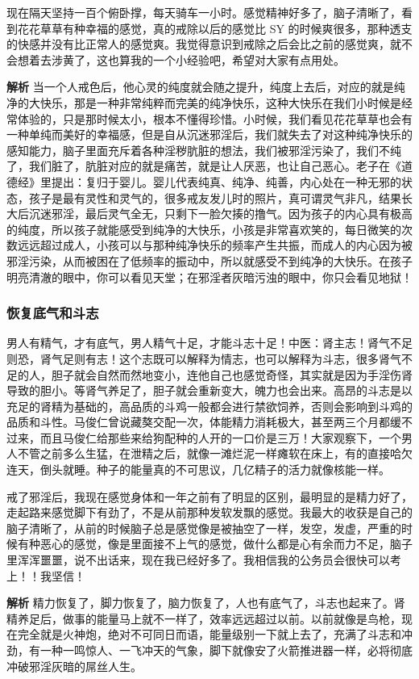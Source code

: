 \begin{case}
    现在隔天坚持一百个俯卧撑，每天骑车一小时。感觉精神好多了，脑子清晰了，看到花花草草有种幸福的感觉，真的戒除以后的感觉比 SY 的时候爽很多，那种透支的快感并没有比正常人的感觉爽。我觉得意识到戒除之后会比之前的感觉爽，就不会想着去涉黄了，这也算我的一个小经验吧，希望对大家有点用处。

    \textbf{解析} 当一个人戒色后，他心灵的纯度就会随之提升，纯度上去后，对应的就是纯净的大快乐，那是一种非常纯粹而完美的纯净快乐，这种大快乐在我们小时候是经常体验的，只是那时候太小，根本不懂得珍惜。小时候，我们看见花花草草也会有一种单纯而美好的幸福感，但是自从沉迷邪淫后，我们就失去了对这种纯净快乐的感知能力，脑子里面充斥着各种淫秽肮脏的想法，我们被邪淫污染了，我们不纯了，我们脏了，肮脏对应的就是痛苦，就是让人厌恶，也让自己恶心。老子在《道德经》里提出：复归于婴儿。婴儿代表纯真、纯净、纯善，内心处在一种无邪的状态，孩子是最有灵性和灵气的，很多戒友发儿时的照片，真可谓灵气非凡，结果长大后沉迷邪淫，最后灵气全无，只剩下一脸欠揍的撸气。因为孩子的内心具有极高的纯度，所以孩子就能感受到纯净的大快乐，小孩是非常喜欢笑的，每日微笑的次数远远超过成人，小孩可以与那种纯净快乐的频率产生共振，而成人的内心因为被邪淫污染，从而被困在了低频率的振动中，所以就感受不到纯净的大快乐。在孩子明亮清澈的眼中，你可以看见天堂；在邪淫者灰暗污浊的眼中，你只会看见地狱！
\end{case}

\subsubsection{恢复底气和斗志}

男人有精气，才有底气，男人精气十足，才能斗志十足！中医：肾主志！肾气不足则恐，肾气足则有志！这个志既可以解释为情志，也可以解释为斗志，很多肾气不足的人，胆子就会自然而然地变小，连他自己也感觉奇怪，其实就是因为手淫伤肾导致的胆小。等肾气养足了，胆子就会重新变大，魄力也会出来。高昂的斗志是以充足的肾精为基础的，高品质的斗鸡一般都会进行禁欲饲养，否则会影响到斗鸡的品质和斗性。马俊仁曾说藏獒交配一次，体能精力消耗极大，甚至两三个月都缓不过来，而且马俊仁给那些来给狗配种的人开的一口价是三万！大家观察下，一个男人不管之前多么生猛，在泄精之后，就像一滩烂泥一样瘫软在床上，有的直接哈欠连天，倒头就睡。种子的能量真的不可思议，几亿精子的活力就像核能一样。

\begin{case}
    戒了邪淫后，我现在感觉身体和一年之前有了明显的区别，最明显的是精力好了，走起路来感觉脚下有劲了，不是从前那种发软发飘的感觉。我最大的收获是自己的脑子清晰了，从前的时候脑子总是感觉像是被抽空了一样，发空，发虚，严重的时候有种恶心的感觉，像是里面接不上气的感觉，做什么都是心有余而力不足，脑子里浑浑噩噩，说不出话来，现在我已经好多了。我相信我的公务员会很快可以考上！！我坚信！

    \textbf{解析} 精力恢复了，脚力恢复了，脑力恢复了，人也有底气了，斗志也起来了。肾精养足后，做事的能量马上就不一样了，效率远远超过以前。以前就像是鸟枪，现在完全就是火神炮，绝对不可同日而语，能量级别一下就上去了，充满了斗志和冲劲，有一种一鸣惊人、一飞冲天的气象，脚下就像安了火箭推进器一样，必将彻底冲破邪淫灰暗的屌丝人生。
\end{case}

